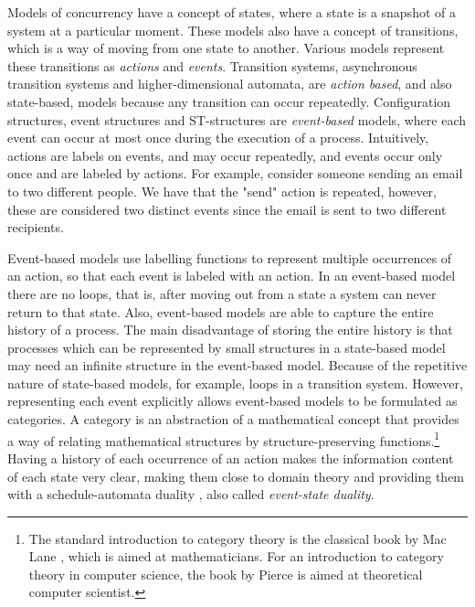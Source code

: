         Models of concurrency have a concept of states, where a state is a snapshot of a system at a particular moment. These models also have a concept of transitions, which is a way of moving from one state to another. Various models represent these transitions as \emph{actions} and \emph{events}. Transition systems, asynchronous transition systems and higher-dimensional automata, are \emph{action based}, and also state-based, models because any transition can occur repeatedly. Configuration structures, event structures and ST-structures are \emph{event-based} models, where each event can occur at most once during the execution of a process. Intuitively, actions are labels on events, and may occur repeatedly, and events occur only once and are labeled by actions. For example, consider someone sending an email to two different people. We have that the "send" action is repeated, however, these are considered two distinct events since the email is sent to two different recipients.
    
        Event-based models use labelling functions to represent multiple occurrences of an action, so that each event is labeled with an action. In an event-based model there are no loops, that is, after moving out from a state a system can never return to that state. Also, event-based models are able to capture the entire history of a process. The main disadvantage of storing the entire history is that processes which can be represented by small structures in a state-based model may need an infinite structure in the event-based model. Because of the repetitive nature of state-based models, for example, loops in a transition system. However, representing each event explicitly allows event-based models to be formulated as categories. A category is an abstraction of a mathematical concept that provides a way of relating mathematical structures by structure-preserving functions.\footnote{The standard introduction to category theory is the classical book by Mac Lane \cite{CategoryTheory71Mathematician}, which is aimed at mathematicians. For an introduction to category theory in computer science, the book by Pierce \cite{CategoryTheory91ComputerScientist} is aimed at theoretical computer scientist.} Having a history of each occurrence of an action makes the information content of each state very clear, making them close to domain theory and providing them with a schedule-automata duality \cite{NielsenPW81eventstructures, GlabbeekP09configStruct}, also called \emph{event-state duality}. 
   
